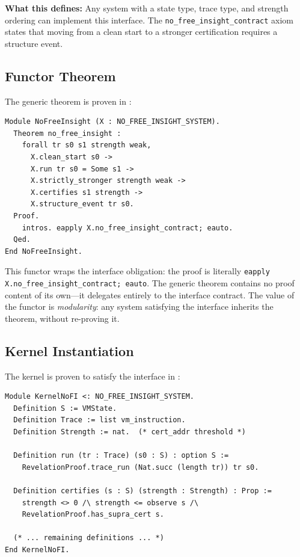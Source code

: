\textbf{What this defines:} Any system with a state type, trace type, and strength ordering can implement this interface. The \texttt{no\_free\_insight\_contract} axiom states that moving from a clean start to a stronger certification requires a structure event.

\subsection{Functor Theorem}

The generic theorem is proven in :
\begin{lstlisting}
Module NoFreeInsight (X : NO_FREE_INSIGHT_SYSTEM).
  Theorem no_free_insight :
    forall tr s0 s1 strength weak,
      X.clean_start s0 ->
      X.run tr s0 = Some s1 ->
      X.strictly_stronger strength weak ->
      X.certifies s1 strength ->
      X.structure_event tr s0.
  Proof.
    intros. eapply X.no_free_insight_contract; eauto.
  Qed.
End NoFreeInsight.
\end{lstlisting}

This functor wraps the interface obligation: the proof is literally \texttt{eapply X.no\_free\_insight\_contract; eauto}. The generic theorem contains no proof content of its own---it delegates entirely to the interface contract. The value of the functor is \textit{modularity}: any system satisfying the interface inherits the theorem, without re-proving it.

\subsection{Kernel Instantiation}

The kernel is proven to satisfy the interface in :
\begin{lstlisting}
Module KernelNoFI <: NO_FREE_INSIGHT_SYSTEM.
  Definition S := VMState.
  Definition Trace := list vm_instruction.
  Definition Strength := nat.  (* cert_addr threshold *)
  
  Definition run (tr : Trace) (s0 : S) : option S :=
    RevelationProof.trace_run (Nat.succ (length tr)) tr s0.
    
  Definition certifies (s : S) (strength : Strength) : Prop :=
    strength <> 0 /\ strength <= observe s /\ 
    RevelationProof.has_supra_cert s.
    
  (* ... remaining definitions ... *)
End KernelNoFI.
\end{lstlisting}

